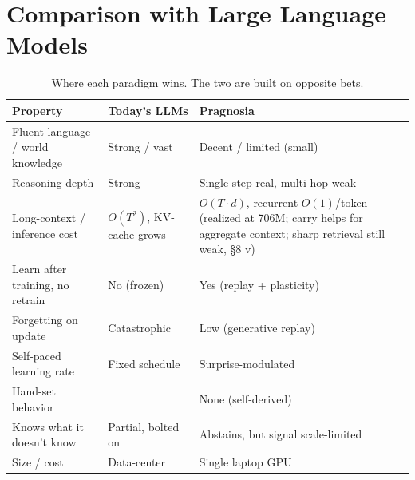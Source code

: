 \documentclass[11pt]{article}
\begin{document}
\section{Comparison with Large Language Models}
\begin{table}[h]\centering\small
\caption{Where each paradigm wins. The two are built on opposite bets.}
\begin{tabular}{@{}p{4.3cm} p{4.0cm} p{6.0cm}@{}}
\toprule
Property & Today's LLMs & Pragnosia \\
\midrule
Fluent language / world knowledge & Strong / vast & Decent / limited (small) \\
Reasoning depth & Strong & Single-step real, multi-hop weak \\
Long-context / inference cost & $O(T^2)$, KV-cache grows & $O(T\cdot d)$, recurrent $O(1)$/token (realized at 706M; carry helps for aggregate context; sharp retrieval still weak, \S8 v) \\
Learn after training, no retrain & No (frozen) & Yes (replay + plasticity) \\
Forgetting on update & Catastrophic & Low (generative replay) \\
Self-paced learning rate & Fixed schedule & Surprise-modulated \\
Hand-set behavior & & None (self-derived) \\
Knows what it doesn't know & Partial, bolted on & Abstains, but signal scale-limited \\
Size / cost & Data-center & Single laptop GPU \\
\bottomrule
\end{tabular}
\end{table}
\end{document}
